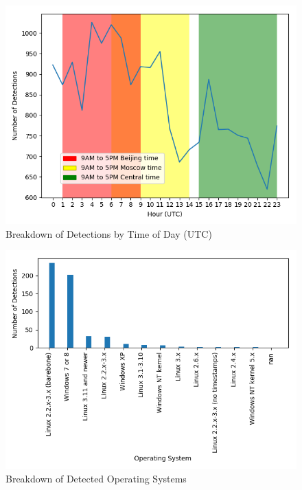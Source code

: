 \documentclass[a0,landscape]{a0poster}
\begin{document}
\begin{multicols}{3}
\begin{figure}[H]
	\begin{center}
		\includegraphics[width=20cm]{time_breakdown.png}
		\caption{Breakdown of Detections by Time of Day (UTC)}
	\end{center}
\end{figure} 

\begin{figure}[H]
	\begin{center}
		\includegraphics[width=25cm]{top_os.png}
		\caption{Breakdown of Detected Operating Systems}
	\end{center}
\end{figure} 


\end{multicols}
\end{document}
